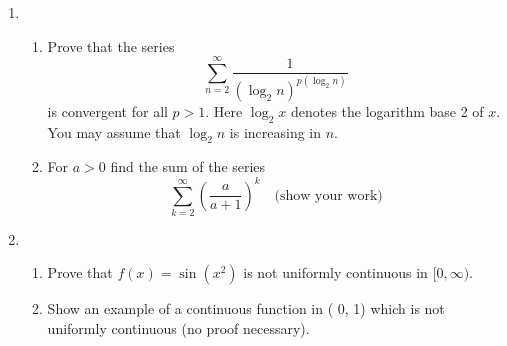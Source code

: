 \documentclass{article}
\begin{document}
\begin{enumerate} 

\item \begin{enumerate}
        \item Prove that the series $$\sum_{n=2}^\infty\frac1{(\log_2n)^{p(\log_2n)}}$$
        is convergent for all $p>1.$ Here $\log_2x$ denotes the logarithm base 2 of $x.$ You may assume
        that $\log_2n$ is increasing in $n.$

        \item For $a>0$ find the sum of the series
        $$\sum_{k=2}^\infty\left(\frac a{a+1}\right)^k\quad\text{(show your work)}$$

    \end{enumerate}
\item \begin{enumerate}
        \item Prove that $f\left(x\right)=\sin\left(x^{2}\right)$ is not uniformly continuous in $[0,\infty).$
        \item Show an example of a continuous function in ( 0, 1)  which is not uniformly
            continuous (no proof necessary).
    \end{enumerate}

\end{enumerate}
\end{document}
